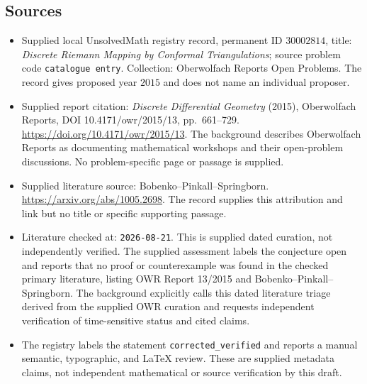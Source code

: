 \documentclass[11pt]{article}
\begin{document}
\subsection{Sources}
\begin{itemize}
\item Supplied local UnsolvedMath registry record, permanent ID \(30002814\), title: \emph{Discrete Riemann Mapping by Conformal Triangulations}; source problem code \texttt{catalogue entry}. Collection: Oberwolfach Reports Open Problems. The record gives proposed year \(2015\) and does not name an individual proposer.
\item Supplied report citation: \emph{Discrete Differential Geometry} (2015), Oberwolfach Reports, DOI 10.4171/owr/2015/13, pp.\ 661--729. \url{https://doi.org/10.4171/owr/2015/13}. The background describes Oberwolfach Reports as documenting mathematical workshops and their open-problem discussions. No problem-specific page or passage is supplied.
\item Supplied literature source: Bobenko--Pinkall--Springborn. \url{https://arxiv.org/abs/1005.2698}. The record supplies this attribution and link but no title or specific supporting passage.
\item Literature checked at: \texttt{2026-08-21}. This is supplied dated curation, not independently verified. The supplied assessment labels the conjecture open and reports that no proof or counterexample was found in the checked primary literature, listing OWR Report 13/2015 and Bobenko--Pinkall--Springborn. The background explicitly calls this dated literature triage derived from the supplied OWR curation and requests independent verification of time-sensitive status and cited claims.
\item The registry labels the statement \texttt{corrected\_verified} and reports a manual semantic, typographic, and LaTeX review. These are supplied metadata claims, not independent mathematical or source verification by this draft.
\end{itemize}
\end{document}
